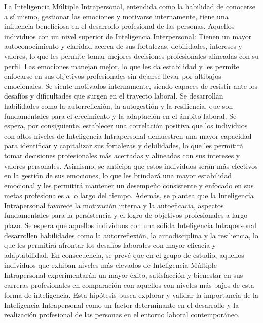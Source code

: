 La Inteligencia Múltiple Intrapersonal, entendida como la habilidad de conocerse a sí mismo, gestionar las emociones y motivarse internamente, tiene una influencia beneficiosa en el desarrollo profesional de las personas. Aquellos individuos con un nivel superior de Inteligencia Interpersonal:
Tienen un mayor autoconocimiento y claridad acerca de sus fortalezas, debilidades, intereses y valores, lo que les permite tomar mejores decisiones profesionales alineadas con su perfil.
Las emociones manejan mejor, lo que les da estabilidad y les permite enfocarse en sus objetivos profesionales sin dejarse llevar por altibajos emocionales.
Se siente motivados internamente, siendo capaces de resistir ante los desafíos y dificultades que surgen en el trayecto laboral.
Se desarrollan habilidades como la autorreflexión, la autogestión y la resiliencia, que son fundamentales para el crecimiento y la adaptación en el ámbito laboral.
Se espera, por consiguiente, establecer una correlación positiva que los individuos con altos niveles de Inteligencia Intrapersonal demuestren una mayor capacidad para identificar y capitalizar sus fortalezas y debilidades, lo que les permitirá tomar decisiones profesionales más acertadas y alineadas con sus intereses y valores personales. Asimismo, se anticipa que estos individuos serán más efectivos en la gestión de sus emociones, lo que les brindará una mayor estabilidad emocional y les permitirá mantener un desempeño consistente y enfocado en sus metas profesionales a lo largo del tiempo.
Además, se plantea que la Inteligencia Intrapersonal favorece la motivación interna y la autoeficacia, aspectos fundamentales para la persistencia y el logro de objetivos profesionales a largo plazo. Se espera que aquellos individuos con una sólida Inteligencia Intrapersonal desarrollen habilidades como la autorreflexión, la autodisciplina y la resiliencia, lo que les permitirá afrontar los desafíos laborales con mayor eficacia y adaptabilidad.
En consecuencia, se prevé que en el grupo de estudio, aquellos individuos que exhiban niveles más elevados de Inteligencia Múltiple Intrapersonal experimentarán un mayor éxito, satisfacción y bienestar en sus carreras profesionales en comparación con aquellos con niveles más bajos de esta forma de inteligencia. Esta hipótesis busca explorar y validar la importancia de la Inteligencia Intrapersonal como un factor determinante en el desarrollo y la realización profesional de las personas en el entorno laboral contemporáneo.
